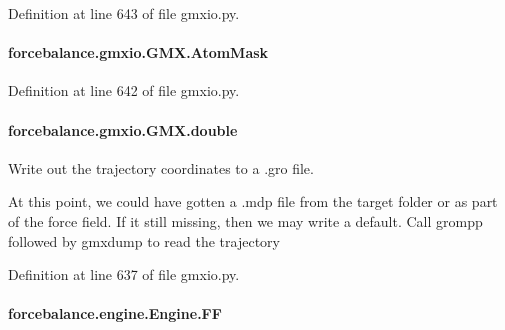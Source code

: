 Definition at line 643 of file gmxio.\-py.

\hypertarget{classforcebalance_1_1gmxio_1_1GMX_a9503a409fe32d337e8b6f89806185ba3}{
\paragraph[{Atom\-Mask}]{\setlength{\rightskip}{0pt plus 5cm}forcebalance.\-gmxio.\-G\-M\-X.\-Atom\-Mask}}\label{classforcebalance_1_1gmxio_1_1GMX_a9503a409fe32d337e8b6f89806185ba3}


Definition at line 642 of file gmxio.\-py.

\hypertarget{classforcebalance_1_1gmxio_1_1GMX_a13a59a8ae726e3a53d8e47ee69109fa5}{
\paragraph[{double}]{\setlength{\rightskip}{0pt plus 5cm}forcebalance.\-gmxio.\-G\-M\-X.\-double}}\label{classforcebalance_1_1gmxio_1_1GMX_a13a59a8ae726e3a53d8e47ee69109fa5}


Write out the trajectory coordinates to a .gro file. 

At this point, we could have gotten a .mdp file from the target folder or as part of the force field. If it still missing, then we may write a default. Call grompp followed by gmxdump to read the trajectory 

Definition at line 637 of file gmxio.\-py.

\hypertarget{classforcebalance_1_1engine_1_1Engine_aeb55142568e89f7a92d745e04ec3c964}{
\paragraph[{F\-F}]{\setlength{\rightskip}{0pt plus 5cm}forcebalance.\-engine.\-Engine.\-F\-F\hspace{0.3cm}{\ttfamily [inherited]}}}\label{classforcebalance_1_1engine_1_1Engine_aeb55142568e89f7a92d745e04ec3c964}


